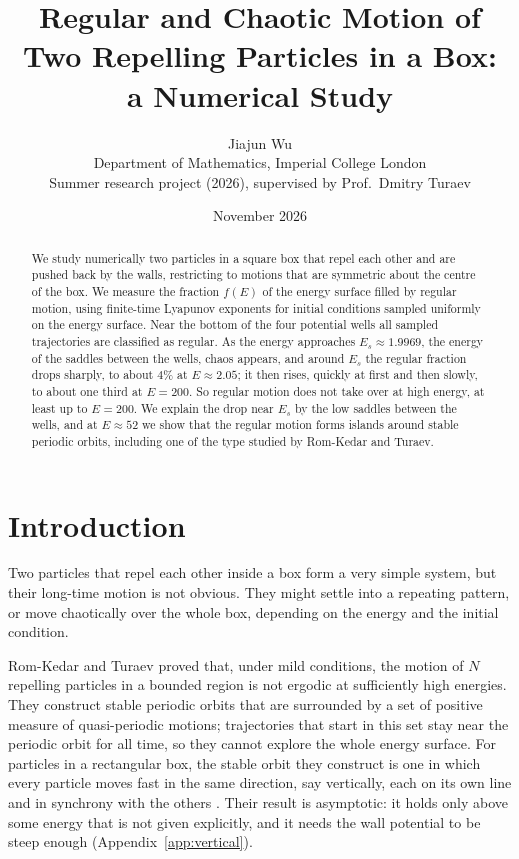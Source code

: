 \documentclass[11pt,a4paper]{article}
\title{Regular and Chaotic Motion of Two Repelling Particles in a Box:\\
a Numerical Study}
\author{Jiajun Wu\\[2pt]
\small Department of Mathematics, Imperial College London\\
\small Summer research project (2026), supervised by Prof.\ Dmitry Turaev}
\date{November 2026}
\begin{document}
\maketitle

\begin{abstract}
We study numerically two particles in a square box that repel each other and
are pushed back by the walls, restricting to motions that are symmetric about
the centre of the box. We measure the fraction $f(E)$ of the energy surface
filled by regular motion, using finite-time Lyapunov exponents for initial
conditions sampled uniformly on the energy surface. Near the bottom of the
four potential wells all sampled trajectories are classified as regular. As the energy approaches
$E_s\approx1.9969$, the energy of the saddles between the wells, chaos
appears, and around $E_s$ the regular fraction drops sharply, to about $4\%$
at $E\approx2.05$; it then rises, quickly at first and then slowly, to about
one third at $E=200$. So
regular motion does not take over at high energy, at least up to $E=200$. We
explain the drop near $E_s$ by the low saddles between the wells, and at
$E\approx52$ we show that the regular motion forms islands around stable
periodic orbits, including one of the type studied by Rom-Kedar and Turaev.
\end{abstract}

\section{Introduction}\label{sec:intro}

Two particles that repel each other inside a box form a very simple system,
but their long-time motion is not obvious. They might settle into a repeating
pattern, or move chaotically over the whole box, depending on the energy and
the initial condition.

Rom-Kedar and Turaev \cite{turaev2022} proved that, under mild conditions,
the motion of $N$ repelling particles in a bounded region is not ergodic at
sufficiently high energies. They construct stable periodic orbits that are
surrounded by a set of positive measure of quasi-periodic motions; trajectories
that start in this set stay near the periodic orbit for all time, so they
cannot explore the whole energy surface. For particles in a rectangular box,
the stable orbit they construct is one in which every particle moves fast in
the same direction, say vertically, each on its own line and in synchrony with
the others \cite[Sec.~2.6]{turaev2022}. Their result is asymptotic: it holds
only above some energy that is not given explicitly, and it needs the wall
potential to be steep enough (Appendix~\ref{app:vertical}).
\end{document}
